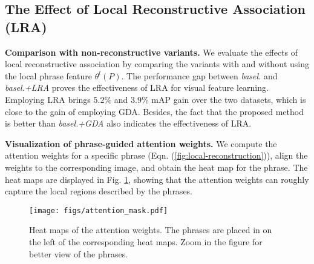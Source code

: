 \documentclass[runningheads]{llncs}
\begin{document}
 
\subsection{The Effect of Local Reconstructive Association (LRA)} 

\textbf{Comparison with non-reconstructive variants.} We evaluate the effects of local reconstructive association by comparing the variants with and without using the local phrase feature $\theta^{l}(P)$. The performance gap between \emph{basel.} and \emph{basel.+LRA} proves the effectiveness of LRA for visual feature learning.  Employing LRA brings $5.2\%$ and $3.9\%$  mAP gain over the two datasets, which is close to the gain of employing GDA.  Besides, the fact that the proposed method is better than \emph{basel.+GDA} also indicates the effectiveness of LRA.

  

\noindent  \textbf{Visualization of phrase-guided attention weights.}  We compute the attention weights for a specific phrase (Eqn. (\ref{fig:local-reconstruction})), align the weights to the corresponding image, and obtain the heat map for the phrase. The heat maps are displayed in Fig. \ref{attention_masks}, showing that the attention weights can roughly capture the local regions described by the phrases.
  
     \begin{figure}[t]
 \begin{center}
\texttt{[image: figs/attention\_mask.pdf]}
 \vspace{-1em}
 \caption{Heat maps of the attention weights. The phrases are placed in on the left of the corresponding heat maps. Zoom in the figure for better view of the phrases.}  \vspace{-1em} \label{attention_masks} 
 \end{center}
\end{figure}
\end{document}
